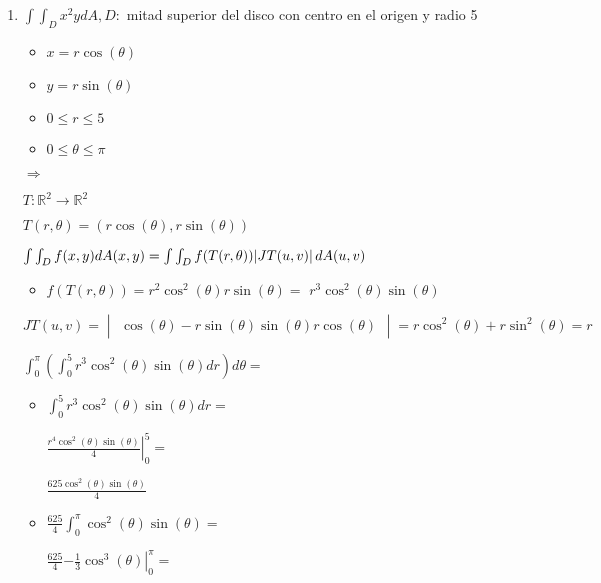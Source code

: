 \documentclass[../practica_09.tex]{subfiles}
\begin{document}
    \begin{enumerate}
        \item $\int\int_D x^2ydA, D:$ mitad superior del disco con centro en el origen y radio 5
        
            \begin{itemize}
                \item $x = r\cos(\theta)$
                \item $y = r\sin(\theta)$
                \item $0\leq r \leq 5$
                \item $0\leq \theta \leq \pi$
            \end{itemize} $\Rightarrow$

            $T:\mathbb{R}^2 \to \mathbb{R}^2$

            $T(r,\theta) = (r\cos(\theta),r\sin(\theta)) $

            $\int\int_D f(x,y) dA(x,y) = \int \int_D f(T(r,\theta)) \abs*{JT(u,v)} dA(u,v)$

            \begin{itemize}
                \item $f(T(r,\theta)) = r^2\cos^2(\theta)r\sin(\theta) = $
                    $r^3\cos^2(\theta)\sin(\theta)$
            \end{itemize}

            $JT(u,v) = \begin{vmatrix}
                \cos(\theta)    -r\sin(\theta)
                \sin(\theta)    r\cos(\theta)
            \end{vmatrix} = r\cos^2(\theta) + r\sin^2(\theta) = r$

            $\int_0^{\pi} (\int_0^5 r^3\cos^2(\theta)\sin(\theta) dr) d\theta = $

            \begin{itemize}
                \item $\int_0^5 r^3\cos^2(\theta)\sin(\theta) dr = $
                
                    $\left. \frac{r^4\cos^2(\theta)\sin(\theta)}{4} \right |_0^5 = $

                    $ \frac{625\cos^2(\theta)\sin(\theta)}{4} $

                \item $\frac{625}{4} \int_0^{\pi} \cos^2(\theta)\sin(\theta) = $
                
                    $\frac{625}{4} \left. -\frac{1}{3} \cos^3(\theta) \right |_0^{\pi} = $


\end{itemize}
\end{enumerate}
\end{document}
